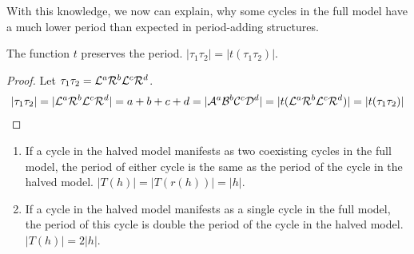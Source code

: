 With this knowledge, we now can explain, why some cycles in the full model have a much lower period than expected in period-adding structures.

\begin{lemma}
	\label{lemma:t.preserves.period}
	The function $t$ preserves the period. $|\tau_1\tau_2| = |t(\tau_1\tau_2)|$.
\end{lemma}

\begin{proof}
	Let $\tau_1\tau_2 = \mathcal{L}^a\mathcal{R}^b\mathcal{L}^c\mathcal{R}^d$.
	\begin{align*}
		|\tau_1\tau_2| =  |\mathcal{L}^a\mathcal{R}^b\mathcal{L}^c\mathcal{R}^d|
		= a + b + c + d
		= |\mathcal{A}^a\mathcal{B}^b\mathcal{C}^c\mathcal{D}^d|
		= |t(\mathcal{L}^a\mathcal{R}^b\mathcal{L}^c\mathcal{R}^d)|
		= |t(\tau_1\tau_2)|
	\end{align*}
\end{proof}

\begin{theorem}
	\begin{enumerate}
		\item If a cycle in the halved model manifests as two coexisting cycles in the full model, the period of either cycle is the same as the period of the cycle in the halved model. $|T(h)| = |T(r(h))| = |h|$.
		\item If a cycle in the halved model manifests as a single cycle in the full model, the period of this cycle is double the period of the cycle in the halved model. $|T(h)| = 2 |h|$.
	\end{enumerate}
\end{theorem}

